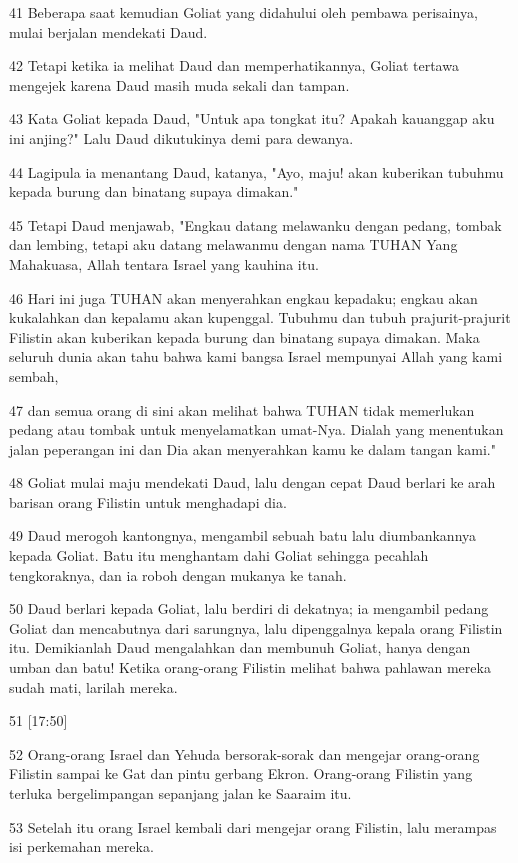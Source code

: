 \par 41 Beberapa saat kemudian Goliat yang didahului oleh pembawa perisainya, mulai berjalan mendekati Daud.
\par 42 Tetapi ketika ia melihat Daud dan memperhatikannya, Goliat tertawa mengejek karena Daud masih muda sekali dan tampan.
\par 43 Kata Goliat kepada Daud, "Untuk apa tongkat itu? Apakah kauanggap aku ini anjing?" Lalu Daud dikutukinya demi para dewanya.
\par 44 Lagipula ia menantang Daud, katanya, "Ayo, maju! akan kuberikan tubuhmu kepada burung dan binatang supaya dimakan."
\par 45 Tetapi Daud menjawab, "Engkau datang melawanku dengan pedang, tombak dan lembing, tetapi aku datang melawanmu dengan nama TUHAN Yang Mahakuasa, Allah tentara Israel yang kauhina itu.
\par 46 Hari ini juga TUHAN akan menyerahkan engkau kepadaku; engkau akan kukalahkan dan kepalamu akan kupenggal. Tubuhmu dan tubuh prajurit-prajurit Filistin akan kuberikan kepada burung dan binatang supaya dimakan. Maka seluruh dunia akan tahu bahwa kami bangsa Israel mempunyai Allah yang kami sembah,
\par 47 dan semua orang di sini akan melihat bahwa TUHAN tidak memerlukan pedang atau tombak untuk menyelamatkan umat-Nya. Dialah yang menentukan jalan peperangan ini dan Dia akan menyerahkan kamu ke dalam tangan kami."
\par 48 Goliat mulai maju mendekati Daud, lalu dengan cepat Daud berlari ke arah barisan orang Filistin untuk menghadapi dia.
\par 49 Daud merogoh kantongnya, mengambil sebuah batu lalu diumbankannya kepada Goliat. Batu itu menghantam dahi Goliat sehingga pecahlah tengkoraknya, dan ia roboh dengan mukanya ke tanah.
\par 50 Daud berlari kepada Goliat, lalu berdiri di dekatnya; ia mengambil pedang Goliat dan mencabutnya dari sarungnya, lalu dipenggalnya kepala orang Filistin itu. Demikianlah Daud mengalahkan dan membunuh Goliat, hanya dengan umban dan batu! Ketika orang-orang Filistin melihat bahwa pahlawan mereka sudah mati, larilah mereka.
\par 51 [17:50]
\par 52 Orang-orang Israel dan Yehuda bersorak-sorak dan mengejar orang-orang Filistin sampai ke Gat dan pintu gerbang Ekron. Orang-orang Filistin yang terluka bergelimpangan sepanjang jalan ke Saaraim itu.
\par 53 Setelah itu orang Israel kembali dari mengejar orang Filistin, lalu merampas isi perkemahan mereka.
